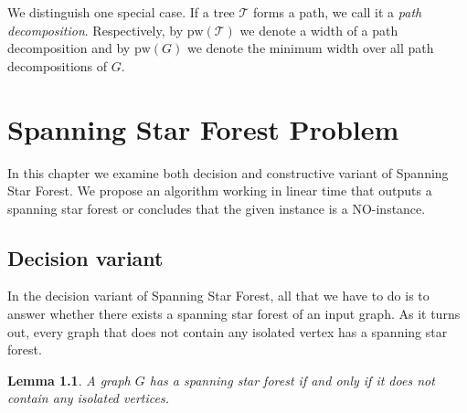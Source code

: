\documentclass[en]{pracamgr}
\newtheorem{lemma}{Lemma}
\theoremstyle{definition}
\newcommand{\ssf}{spanning star forest}
\newcommand{\ssfp}{{\sc Spanning Star Forest}}
\begin{document}
We distinguish one special case. If a tree $\mathcal{T}$ forms a path, we call it a \emph{path decomposition}. Respectively, by $\textrm{pw}(\mathcal{T})$ we denote a width of a path decomposition and by $\textrm{pw}(G)$ we denote the minimum width over all path decompositions of $G$.

\chapter{Spanning Star Forest Problem}\label{sec3}

In this chapter we examine both decision and constructive variant of \ssfp{}. We propose an algorithm working in linear time that outputs a \ssf{} or concludes that the given instance is a NO-instance.

\section{Decision variant}

In the decision variant of \ssfp{}, all that we have to do is to answer whether there exists a spanning star forest of an input graph. As it turns out, every graph that does not contain any isolated vertex has a \ssf{}.

\begin{lemma}\label{SSF lemma}
 A graph $G$ has a \ssf{} if and only if it does not contain any isolated vertices.
\end{lemma}
\end{document}
